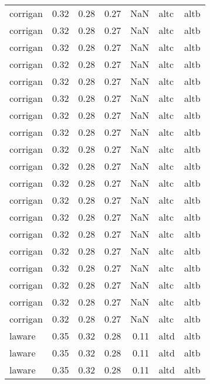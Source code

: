 \begin{tabular}{lrrrrll}
  corrigan &     0.32 &     0.28 &     0.27 &      NaN &      altc &     altb \\
  corrigan &     0.32 &     0.28 &     0.27 &      NaN &      altc &     altb \\
  corrigan &     0.32 &     0.28 &     0.27 &      NaN &      altc &     altb \\
  corrigan &     0.32 &     0.28 &     0.27 &      NaN &      altc &     altb \\
  corrigan &     0.32 &     0.28 &     0.27 &      NaN &      altc &     altb \\
  corrigan &     0.32 &     0.28 &     0.27 &      NaN &      altc &     altb \\
  corrigan &     0.32 &     0.28 &     0.27 &      NaN &      altc &     altb \\
  corrigan &     0.32 &     0.28 &     0.27 &      NaN &      altc &     altb \\
  corrigan &     0.32 &     0.28 &     0.27 &      NaN &      altc &     altb \\
  corrigan &     0.32 &     0.28 &     0.27 &      NaN &      altc &     altb \\
  corrigan &     0.32 &     0.28 &     0.27 &      NaN &      altc &     altb \\
  corrigan &     0.32 &     0.28 &     0.27 &      NaN &      altc &     altb \\
  corrigan &     0.32 &     0.28 &     0.27 &      NaN &      altc &     altb \\
  corrigan &     0.32 &     0.28 &     0.27 &      NaN &      altc &     altb \\
  corrigan &     0.32 &     0.28 &     0.27 &      NaN &      altc &     altb \\
  corrigan &     0.32 &     0.28 &     0.27 &      NaN &      altc &     altb \\
  corrigan &     0.32 &     0.28 &     0.27 &      NaN &      altc &     altb \\
  corrigan &     0.32 &     0.28 &     0.27 &      NaN &      altc &     altb \\
  corrigan &     0.32 &     0.28 &     0.27 &      NaN &      altc &     altb \\
    laware &     0.35 &     0.32 &     0.28 &     0.11 &      altd &     altb \\
    laware &     0.35 &     0.32 &     0.28 &     0.11 &      altd &     altb \\
    laware &     0.35 &     0.32 &     0.28 &     0.11 &      altd &     altb \\

\end{tabular}
